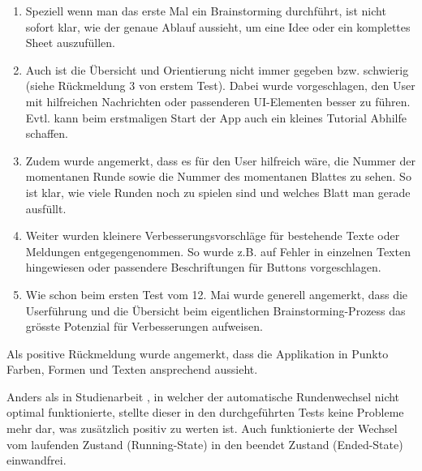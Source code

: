 \begin{enumerate}
	\item Speziell wenn man das erste Mal ein Brainstorming durchführt, ist nicht sofort klar, wie der genaue Ablauf aussieht, um eine Idee oder ein komplettes Sheet auszufüllen. 
	\item Auch ist die Übersicht und Orientierung nicht immer gegeben bzw. schwierig (siehe Rückmeldung 3 von erstem Test). Dabei wurde vorgeschlagen, den User mit hilfreichen Nachrichten oder passenderen UI-Elementen besser zu führen. Evtl. kann beim erstmaligen Start der App auch ein kleines Tutorial Abhilfe schaffen.
	\item Zudem wurde angemerkt, dass es für den User hilfreich wäre, die Nummer der momentanen Runde sowie die Nummer des momentanen Blattes zu sehen. So ist klar, wie viele Runden noch zu spielen sind und welches Blatt man gerade ausfüllt.
	\item Weiter wurden kleinere Verbesserungsvorschläge für bestehende Texte oder Meldungen entgegengenommen. So wurde z.B. auf Fehler in einzelnen Texten hingewiesen oder passendere Beschriftungen für Buttons vorgeschlagen.
	\item  Wie schon beim ersten Test vom 12. Mai wurde generell angemerkt, dass die Userführung und die Übersicht beim eigentlichen Brainstorming-Prozess das grösste Potenzial für Verbesserungen aufweisen.
\end{enumerate}

Als positive Rückmeldung wurde angemerkt, dass die Applikation in Punkto Farben, Formen und Texten ansprechend aussieht.

Anders als in Studienarbeit \cite{methode635-sa}, in welcher der automatische Rundenwechsel nicht optimal funktionierte, stellte dieser in den durchgeführten Tests keine Probleme mehr dar, was zusätzlich positiv zu werten ist. Auch funktionierte der Wechsel vom laufenden Zustand (Running-State) in den beendet Zustand (Ended-State) einwandfrei. 

